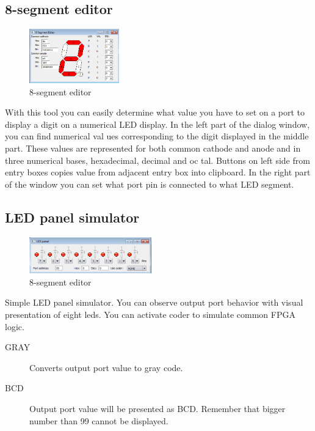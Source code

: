 \subsection{8-segment editor}
    \begin{figure}
        \centering{}
        \includegraphics[width=110pt]{img/8segment.png}
        \caption{8-segment editor}
    \end{figure}
    With this tool you can easily determine what value you have to set on a port to display a digit on a numerical LED display. In the left part of the dialog window, you can find numerical val ues corresponding to the digit displayed in the middle part. These values are represented for both common cathode and anode and in three numerical bases, hexadecimal, decimal and oc tal. Buttons on left side from entry boxes copies value from adjacent entry box into clipboard. In the right part of the window you can set what port pin is connected to what LED segment.

\subsection{LED panel simulator}
    \begin{figure}
        \centering{}
        \includegraphics[width=150pt]{img/Led_panel.png}
        \caption{8-segment editor}
    \end{figure}
    Simple LED panel simulator. You can observe output port behavior with visual presentation of eight leds. You can activate coder to simulate common FPGA logic.

    \begin{description}
        \item[GRAY] Converts output port value to gray code.
        \item[BCD] Output port value will be presented as BCD. Remember that bigger number than 99 cannot be displayed.
    \end{description}

